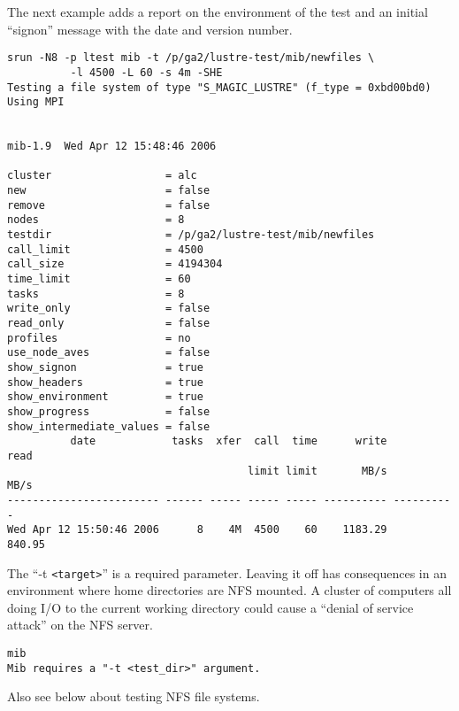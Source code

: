 \documentclass{article}
\begin{document}
\pagebreak
The next example adds a report on the environment of the test and an
initial ``signon'' message with the date and version number.
{\small
  \begin{verbatim}
srun -N8 -p ltest mib -t /p/ga2/lustre-test/mib/newfiles \
          -l 4500 -L 60 -s 4m -SHE
Testing a file system of type "S_MAGIC_LUSTRE" (f_type = 0xbd00bd0)
Using MPI


mib-1.9  Wed Apr 12 15:48:46 2006

cluster                  = alc
new                      = false
remove                   = false
nodes                    = 8
testdir                  = /p/ga2/lustre-test/mib/newfiles
call_limit               = 4500
call_size                = 4194304
time_limit               = 60
tasks                    = 8
write_only               = false
read_only                = false
profiles                 = no
use_node_aves            = false
show_signon              = true
show_headers             = true
show_environment         = true
show_progress            = false
show_intermediate_values = false
          date            tasks  xfer  call  time      write       read
                                      limit limit       MB/s       MB/s
------------------------ ------ ----- ----- ----- ---------- ----------
Wed Apr 12 15:50:46 2006      8    4M  4500    60    1183.29     840.95
  \end{verbatim}
}
The ``-t \verb+<target>+'' is a required parameter.  Leaving it off
has consequences in an environment where home directories are NFS
mounted.  A cluster of computers all doing I/O to the current
working directory could cause a ``denial of service attack'' on the
NFS server.
\begin{verbatim}
mib
Mib requires a "-t <test_dir>" argument.
\end{verbatim}
Also see below about testing NFS file systems.  
\end{document}
